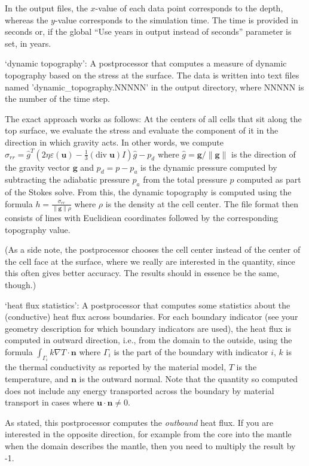 \begin{itemize}
In the output files, the $x$-value of each data point corresponds to the depth, whereas the $y$-value corresponds to the simulation time. The time is provided in seconds or, if the global ``Use years in output instead of seconds'' parameter is set, in years.

`dynamic topography': A postprocessor that computes a measure of dynamic topography based on the stress at the surface. The data is written into text files named 'dynamic\_topography.NNNNN' in the output directory, where NNNNN is the number of the time step.

The exact approach works as follows: At the centers of all cells that sit along the top surface, we evaluate the stress and evaluate the component of it in the direction in which gravity acts. In other words, we compute $\sigma_{rr}={\hat g}^T(2 \eta \varepsilon(\mathbf u)- \frac 13 (\textrm{div}\;\mathbf u)I)\hat g - p_d$ where $\hat g = \mathbf g/\|\mathbf g\|$ is the direction of the gravity vector $\mathbf g$ and $p_d=p-p_a$ is the dynamic pressure computed by subtracting the adiabatic pressure $p_a$ from the total pressure $p$ computed as part of the Stokes solve. From this, the dynamic topography is computed using the formula $h=\frac{\sigma_{rr}}{\|\mathbf g\| \rho}$ where $\rho$ is the density at the cell center.
The file format then consists of lines with Euclidiean coordinates followed by the corresponding topography value.

(As a side note, the postprocessor chooses the cell center instead of the center of the cell face at the surface, where we really are interested in the quantity, since this often gives better accuracy. The results should in essence be the same, though.)

`heat flux statistics': A postprocessor that computes some statistics about the (conductive) heat flux across boundaries. For each boundary indicator (see your geometry description for which boundary indicators are used), the heat flux is computed in outward direction, i.e., from the domain to the outside, using the formula $\int_{\Gamma_i} k \nabla T \cdot \mathbf n$ where $\Gamma_i$ is the part of the boundary with indicator $i$, $k$ is the thermal conductivity as reported by the material model, $T$ is the temperature, and $\mathbf n$ is the outward normal. Note that the quantity so computed does not include any energy transported across the boundary by material transport in cases where $\mathbf u \cdot \mathbf n \neq 0$.

As stated, this postprocessor computes the \textit{outbound} heat flux. If you are interested in the opposite direction, for example from the core into the mantle when the domain describes the mantle, then you need to multiply the result by -1.


\end{itemize}
